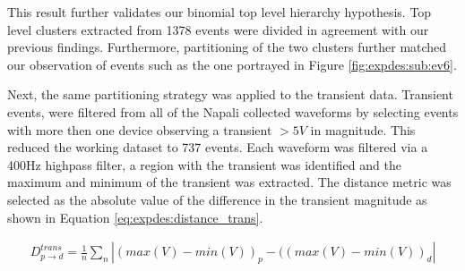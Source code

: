 This result further validates our binomial top level hierarchy hypothesis.
Top level clusters extracted from 1378 events were divided in agreement with our previous findings.
Furthermore, partitioning of the two clusters further matched our observation of events such as the one portrayed in Figure \ref{fig:expdes:sub:ev6}.

Next, the same partitioning strategy was applied to the transient data.
Transient events, were filtered from all of the Napali collected waveforms by selecting events with more then one device observing a transient $>5V$ in magnitude.
This reduced the working dataset to 737 events.
Each waveform was filtered via a 400Hz highpass filter, a region with the transient was identified and the maximum and minimum of the transient was extracted.
The distance metric was selected as the absolute value of the difference in the transient magnitude as shown in Equation \ref{eq:expdes:distance_trans}.

\begin{equation} \label{eq:expdes:distance_trans}
\begin{aligned}
    D_{p \rightarrow d}^{trans} = \frac{1}{n}\sum_{n}|(max(V) - min(V))_{p} - ((max(V) - min(V))_{d}|
\end{aligned}
\end{equation}

